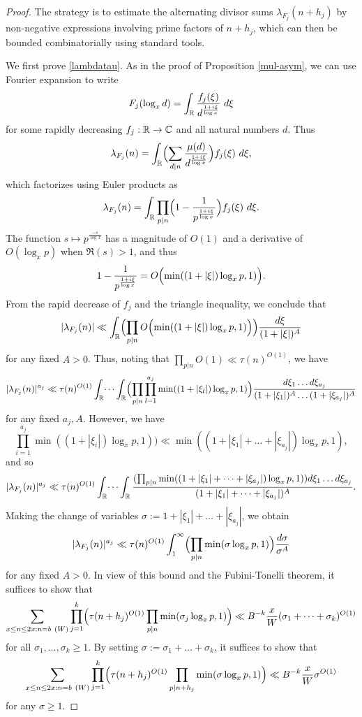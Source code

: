 \begin{proof}  The strategy is to estimate the alternating divisor sums $\lambda_{F_j}(n+h_j)$ by non-negative expressions involving prime factors of $n+h_j$, which can then be bounded combinatorially using standard tools.

We first prove \eqref{lambdatau}.
As in the proof of Proposition \ref{mul-asym}, we can use Fourier expansion to write
$$ F_j( \log_x d ) = \int_{\mathbb{R}} \frac{f_j(\xi)}{d^{\frac{1+i\xi}{\log x}}}\ d\xi$$
for some rapidly decreasing $f_j: \mathbb{R} \to \mathbb{C}$ and all natural numbers $d$.  Thus
$$ \lambda_{F_j}(n) = \int_{\mathbb{R}} \Bigl(\sum_{d|n} \frac{\mu(d)}{d^{\frac{1+i\xi}{\log x}}}\Bigr) f_j(\xi)\ d\xi, $$
which factorizes using Euler products as
$$ \lambda_{F_j}(n) = \int_{\mathbb{R}} \prod_{p|n} \Bigl(1 - \frac{1}{p^{\frac{1+i\xi}{\log x}}}\Bigr) f_j(\xi)\ d\xi.$$
The function $s \mapsto p^{\frac{-s}{\log x}}$ has a magnitude of $O(1)$ and a derivative of $O( \log_x p )$ when $\Re(s) > 1$, and thus
$$ 1 - \frac{1}{p^{\frac{1+i\xi}{\log x}}} = O\Bigl( \min( (1+|\xi|) \log_x p, 1) \Bigr).$$
From the rapid decrease of $f_j$ and the triangle inequality, we conclude that
$$ |\lambda_{F_j}(n)| \ll \int_{\mathbb{R}} \Bigl(\prod_{p|n} O\Bigl( \min( (1+|\xi|) \log_x p, 1)\Bigr)\Bigr) \frac{d\xi}{(1+|\xi|)^A}$$
for any fixed $A > 0$. Thus, noting that $\prod_{p|n}O(1)\ll \tau(n)^{O(1)}$, we have
$$ |\lambda_{F_j}(n)|^{a_j} \ll \tau(n)^{O(1)}\int_{\mathbb{R}} \dots \int_{\mathbb{R}} \Bigl(\prod_{p|n}  \prod_{l=1}^{a_j} \min( (1+|\xi_l|) \log_x p, 1)\Bigr) \frac{d\xi_1 \dots d\xi_{a_j}}{(1+|\xi_1|)^A \dots (1+|\xi_{a_j}|)^A}
$$
for any fixed $a_j,A$. However, we have
$$ \prod_{i=1}^{a_j}\min( (1+|\xi_i|) \log_x p, 1)) \ll \min( (1+|\xi_1|+\dots+|\xi_{a_j}|) \log_x p, 1 ), $$
and so
$$ |\lambda_{F_j}(n)|^{a_j} \ll \tau(n)^{O(1)}\int_{\mathbb{R}} \dots \int_{\mathbb{R}} \frac{(\prod_{p|n} \min( (1+|\xi_1|+\dots+|\xi_{a_j}|) \log_x p, 1)) d\xi_1 \dots d \xi_{a_j}}{(1+|\xi_1|+\dots+|\xi_{a_j}|)^A}.$$
Making the change of variables $\sigma := 1+|\xi_1|+\dots+|\xi_{a_j}|$, we obtain
$$ |\lambda_{F_j}(n)|^{a_j} \ll \tau(n)^{O(1)} \int_1^\infty \Bigl(\prod_{p|n} \min(\sigma \log_x p, 1)\Bigr) \frac{d\sigma}{\sigma^A}$$
for any fixed $A>0$.  In view of this bound and the Fubini-Tonelli theorem, it suffices to show that
$$
\sum_{x \leq n \leq 2x: n = b\ (W)} \prod_{j=1}^k \Bigl(\tau(n+h_j)^{O(1)} \prod_{p|n} \min(\sigma_j \log_x p,1)\Bigr) \ll B^{-k} \frac{x}{W} (\sigma_1+\dots+\sigma_k)^{O(1)}$$
for all $\sigma_1,\dots,\sigma_k \geq 1$. By setting $\sigma := \sigma_1+\dots+\sigma_k$, it suffices to show that
\begin{equation}\label{xnx}
\sum_{x \leq n \leq 2x: n = b\ (W)} \prod_{j=1}^k \Bigl(\tau(n+h_j)^{O(1)} \prod_{p|n+h_j} \min(\sigma \log_x p,1)\Bigr) \ll B^{-k} \frac{x}{W} \sigma^{O(1)}
\end{equation}
for any $\sigma \geq 1$.


\end{proof}
